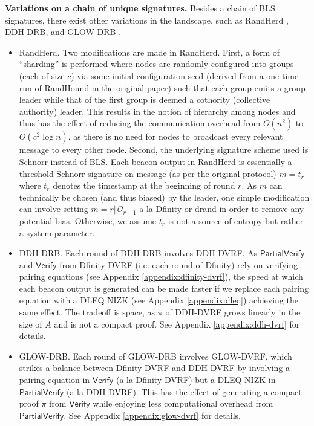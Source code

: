 \documentclass[letterpaper,twocolumn,10pt]{article}
\theoremstyle{definition}
\theoremstyle{remark}
\begin{document}
\noindent\textbf{Variations on a chain of unique signatures.} Besides a chain of BLS signatures, there exist other variations in the landscape, such as RandHerd \cite{syta2017scalable}, DDH-DRB, and GLOW-DRB \cite{galindo2020fully}.
\begin{itemize}
\item RandHerd. Two modifications are made in RandHerd. First, a form of ``sharding'' is performed where nodes are randomly configured into groups (each of size $c$) via some initial configuration seed (derived from a one-time run of RandHound in the original paper) such that each group emits a group leader while that of the first group is deemed a cothority (collective authority) leader. This results in the notion of hierarchy among nodes and thus has the effect of reducing the communication overhead from $O(n^2)$ to $O(c^2 \log n)$, as there is no need for nodes to broadcast every relevant message to every other node. Second, the underlying signature scheme used is Schnorr instead of BLS. Each beacon output in RandHerd is essentially a threshold Schnorr signature on message (as per the original protocol) $m = t_r$ where $t_r$ denotes the timestamp at the beginning of round $r$. As $m$ can technically be chosen (and thus biased) by the leader, one simple modification can involve setting $m = r \mathbin\Vert \mathcal{O}_{r - 1}$ a la Dfinity or drand in order to remove any potential bias. Otherwise, we assume $t_r$ is not a source of entropy but rather a system parameter.
\item DDH-DRB. Each round of DDH-DRB involves DDH-DVRF. As $\mathsf{PartialVerify}$ and $\mathsf{Verify}$ from Dfinity-DVRF (i.e. each round of Dfinity) rely on verifying pairing equations (see Appendix \ref{appendix:dfinity-dvrf}), the speed at which each beacon output is generated can be made faster if we replace each pairing equation with a DLEQ NIZK (see Appendix \ref{appendix:dleq}) achieving the same effect. The tradeoff is space, as $\pi$ of DDH-DVRF grows linearly in the size of $A$ and is not a compact proof. See Appendix \ref{appendix:ddh-dvrf} for details.
\item GLOW-DRB. Each round of GLOW-DRB involves GLOW-DVRF, which strikes a balance between Dfinity-DVRF and DDH-DVRF by involving a pairing equation in $\mathsf{Verify}$ (a la Dfinity-DVRF) but a DLEQ NIZK in $\mathsf{PartialVerify}$ (a la DDH-DVRF). This has the effect of generating a compact proof $\pi$ from $\mathsf{Verify}$ while enjoying less computational overhead from $\mathsf{PartialVerify}$. See Appendix \ref{appendix:glow-dvrf} for details.
\end{itemize}
\end{document}

